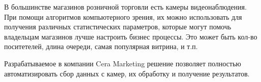 \Introduction
В большинстве магазинов розничной торговли есть камеры видеонаблюдения. При помощи алгоритмов компьютерного зрения, их можно использовать для получения различных статистических параметров, которые могут помочь владельцам магазинов лучше настроить бизнес процессы. Это может быть кол-во поситетелей, длина очереди, самая популярная витрина, и т.п.

Разрабатываемое в компании Cera Marketing решение позволяет полностью автоматизировать сбор данных с камер, их обработку и получение результатов.


